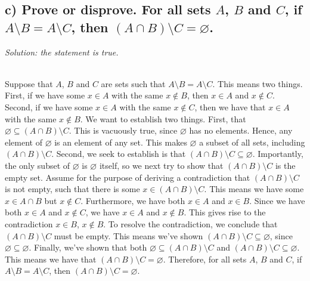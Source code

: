 \documentclass[11pt, letterpaper]{article}
\begin{document}
\subsection*{c) Prove or disprove. For all sets $A$, $B$ and $C$, if $A \setminus B = A \setminus C$, then $(A\cap B) \setminus C =\varnothing$.}
{\large\it Solution: the statement is true.}
\begin{prf}~\\
    Suppose that $A$, $B$ and $C$ are sets such that $A\setminus B = A\setminus C$. This means two things. First, if we have some $x\in A$ with the same $x\notin B$, then $x\in A$ and $x\notin C$. Second, if we have some $x\in A$ with the same $x\notin C$, then we have that $x\in A$ with the same $x\notin B$. 
    We want to establish two things. First, that $\varnothing \subseteq (A\cap B)\setminus C$. This is vacuously true, since $\varnothing$ has no elements. Hence, any element of $\varnothing$ is an element of any set. This makes $\varnothing$ a subset of all sets, including $(A\cap B)\setminus C$. 
    Second, we seek to establish is that $(A\cap B)\setminus C \subseteq \varnothing$. Importantly, the only subset of $\varnothing$ is $\varnothing$ itself, so we next try to show that $(A\cap B)\setminus C$ is the empty set. Assume for the purpose of deriving a contradiction that $(A\cap B)\setminus C$ is not empty, such that there is some $x\in (A\cap B)\setminus C$.
    This means we have some $x\in A\cap B$ but $x\notin C$. Furthermore, we have both $x\in A$ and $x\in B$. Since we have both $x\in A$ and $x\notin C$, we have $x\in A$ and $x\notin B$. This gives rise to the contradiction $x\in B$, $x\notin B$. To resolve the contradiction, we conclude that $(A\cap B)\setminus C$ must be empty. This means we've shown $(A\cap B)\setminus C \subseteq \varnothing$, since $\varnothing \subseteq \varnothing$. 
    Finally, we've shown that both $\varnothing \subseteq (A\cap B)\setminus C$ and $(A\cap B)\setminus C \subseteq \varnothing$. This means we have that $(A\cap B)\setminus C = \varnothing$. Therefore, for all sets $A$, $B$ and $C$, if $A \setminus B = A \setminus C$, then $(A\cap B) \setminus C =\varnothing$.
\end{prf}
\end{document}
